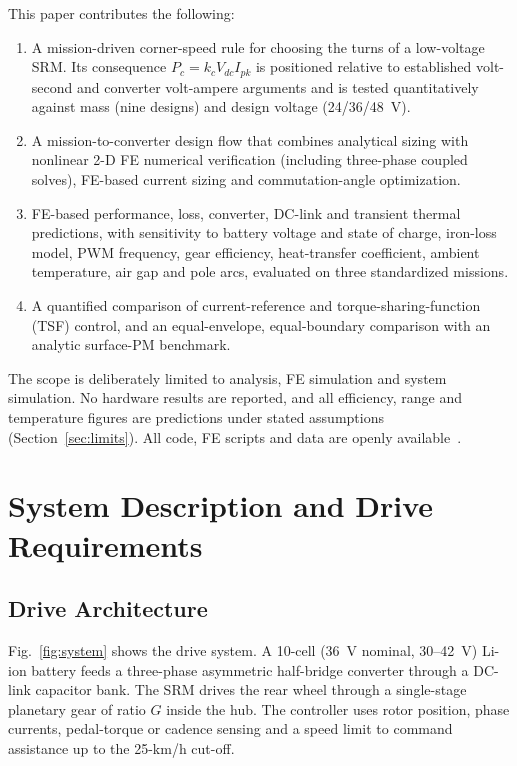 \documentclass[journal]{IEEEtran}
\begin{document}
This paper contributes the following:
\begin{enumerate}
\item A mission-driven corner-speed rule for choosing the turns of a
low-voltage SRM. Its consequence $P_c=k_cV_{dc}I_{pk}$ is positioned relative
to established volt-second and converter volt-ampere arguments and is tested
quantitatively against mass (nine designs) and design voltage (24/36/48~V).
\item A mission-to-converter design flow that combines analytical sizing with
nonlinear 2-D FE numerical verification (including three-phase coupled solves),
FE-based current sizing and commutation-angle optimization.
\item FE-based performance, loss, converter, DC-link and transient thermal
predictions, with sensitivity to battery voltage and state of charge, iron-loss
model, PWM frequency, gear efficiency, heat-transfer coefficient, ambient
temperature, air gap and pole arcs, evaluated on three standardized missions.
\item A quantified comparison of current-reference and torque-sharing-function
(TSF) control, and an equal-envelope, equal-boundary comparison with an analytic
surface-PM benchmark.
\end{enumerate}
The scope is deliberately limited to analysis, FE simulation and system
simulation. No hardware results are reported, and all efficiency, range and
temperature figures are predictions under stated assumptions
(Section~\ref{sec:limits}). All code, FE scripts and data are openly
available~\cite{repo}.

\section{System Description and Drive Requirements}

\subsection{Drive Architecture}
Fig.~\ref{fig:system} shows the drive system. A 10-cell (36~V nominal, 30--42~V)
Li-ion battery feeds a three-phase asymmetric half-bridge converter through a
DC-link capacitor bank. The SRM drives the rear wheel through a single-stage
planetary gear of ratio $G$ inside the hub. The controller uses rotor position,
phase currents, pedal-torque or cadence sensing and a speed limit to command
assistance up to the 25-km/h cut-off.
\end{document}
